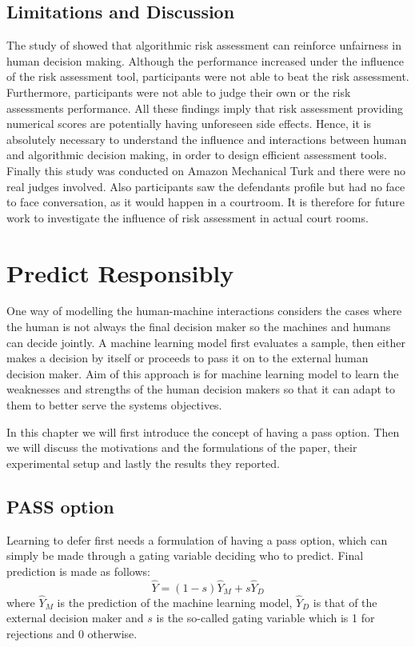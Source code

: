 \documentclass[11pt,a4paper,final]{article}
\begin{document}
\subsection{Limitations and Discussion}
The study of \citet{green2019disparate} showed that algorithmic risk assessment can reinforce unfairness in human decision making. Although the performance increased under the influence of the risk assessment tool, participants were not able to beat the risk assessment. Furthermore, participants were not able to judge their own or the risk assessments performance. All these findings imply that risk assessment providing numerical scores are potentially having unforeseen side effects. Hence, it is absolutely necessary to understand the influence and interactions between human and algorithmic decision making, in order to design efficient assessment tools. 
Finally this study was conducted on Amazon Mechanical Turk and there were no real judges involved. Also participants saw the defendants profile but had no face to face conversation, as it would happen in a courtroom. It is therefore for future work to investigate the influence of risk assessment in actual court rooms. 

\section{Predict Responsibly}
\label{sec:paper2}
One way of modelling the human-machine interactions considers the cases where the human is not always the final decision maker so the machines and humans can decide jointly. A machine learning model first evaluates a sample, then either makes a decision by itself or proceeds to pass it on to the external human decision maker. Aim of this approach is for machine learning model to learn the weaknesses and strengths of the human decision makers so that it can adapt to them to better serve the systems objectives.
\par In this chapter we will first introduce the concept of having a pass option. Then we will discuss the motivations and the formulations of the \citet{madras2018predict} paper, their experimental setup and lastly the results they reported.

\subsection{PASS option}
Learning to defer first needs a formulation of having a pass option, which can simply be made through a gating variable deciding who to predict. Final prediction is made as follows:
\begin{equation}
    \hat{Y} = (1-s)\hat{Y}_{M} + s\hat{Y}_{D}
\end{equation}
where $\hat{Y}_{M}$ is the prediction of the machine learning model, $\hat{Y}_{D}$ is that of the external decision maker and $s$ is the so-called gating variable which is 1 for rejections and 0 otherwise.
\end{document}
